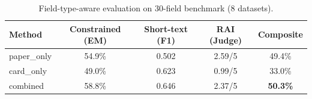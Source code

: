 \begin{table}[h]
\centering
\caption{Field-type-aware evaluation on 30-field benchmark (8 datasets).}
\begin{tabular}{lcccc}
\toprule
Method & Constrained (EM) & Short-text (F1) & RAI (Judge) & Composite \\
\midrule
paper_only & 54.9\% & 0.502 & 2.59/5 & 49.4\% \\
card_only & 49.0\% & 0.623 & 0.99/5 & 33.0\% \\
combined & 58.8\% & 0.646 & 2.37/5 & \textbf{50.3\%} \\
\bottomrule
\end{tabular}
\end{table}